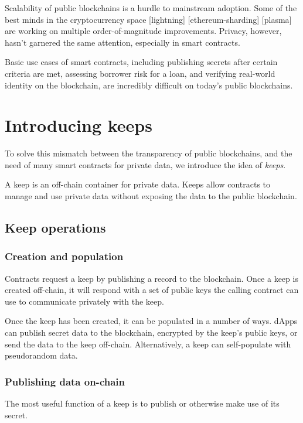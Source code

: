 \documentclass[11pt]{article}
\begin{document}
Scalability of public blockchains is a hurdle to mainstream adoption.
Some of the best minds in the cryptocurrency space [lightning]
[ethereum-sharding] [plasma] are working on multiple order-of-magnitude
improvements. Privacy, however, hasn’t garnered the same attention,
especially in smart contracts.

Basic use cases of smart contracts, including publishing secrets after
certain criteria are met, assessing borrower risk for a loan, and
verifying real-world identity on the blockchain, are incredibly
difficult on today’s public blockchains.

\section{Introducing keeps}

To solve this mismatch between the transparency of public blockchains,
and the need of many smart contracts for private data, we introduce
the idea of {\em keeps}.

A keep is an off-chain container for private data. Keeps allow
contracts to manage and use private data without exposing the data to
the public blockchain.

\subsection{Keep operations}

\subsubsection{Creation and population}

Contracts request a keep by publishing a record to the blockchain.
Once a keep is created off-chain, it will respond with a set of public
keys the calling contract can use to communicate privately with the
keep.

Once the keep has been created, it can be populated in a number of
ways. dApps can publish secret data to the blockchain, encrypted by
the keep’s public keys, or send the data to the keep off-chain.
Alternatively, a keep can self-populate with pseudorandom data.

\subsubsection{Publishing data on-chain}

The most useful function of a keep is to publish or otherwise make use
of its secret.
\end{document}
